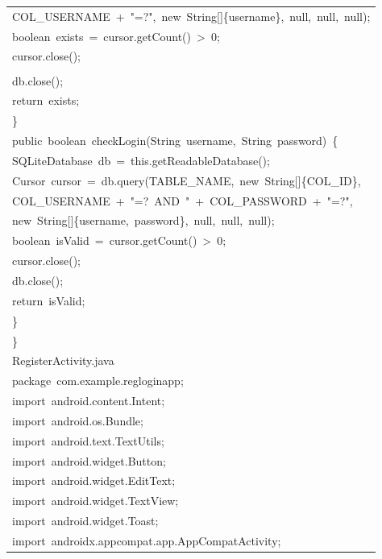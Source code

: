 \documentclass[a4paper,12pt]{article}
\begin{document}
\begin{longtable}{|p{}|}
{\ttfamily\small COL\_USERNAME\ +\ "=?",\ new\ String[]\{username\},\ null,\ null,\ null);} \\
{\ttfamily\small boolean\ exists\ =\ cursor.getCount()\ \textgreater{}\ 0;} \\
{\ttfamily\small cursor.close();} \\
\strut \\
{\ttfamily\small db.close();} \\
{\ttfamily\small return\ exists;} \\
{\ttfamily\small \}} \\
{\ttfamily\small public\ boolean\ checkLogin(String\ username,\ String\ password)\ \{} \\
{\ttfamily\small SQLiteDatabase\ db\ =\ this.getReadableDatabase();} \\
{\ttfamily\small Cursor\ cursor\ =\ db.query(TABLE\_NAME,\ new\ String[]\{COL\_ID\},} \\
{\ttfamily\small COL\_USERNAME\ +\ "=?\ AND\ "\ +\ COL\_PASSWORD\ +\ "=?",} \\
{\ttfamily\small new\ String[]\{username,\ password\},\ null,\ null,\ null);} \\
{\ttfamily\small boolean\ isValid\ =\ cursor.getCount()\ \textgreater{}\ 0;} \\
{\ttfamily\small cursor.close();} \\
{\ttfamily\small db.close();} \\
{\ttfamily\small return\ isValid;} \\
{\ttfamily\small \}} \\
{\ttfamily\small \}} \\
{\ttfamily\small RegisterActivity.java} \\
{\ttfamily\small package\ com.example.regloginapp;} \\
{\ttfamily\small import\ android.content.Intent;} \\
{\ttfamily\small import\ android.os.Bundle;} \\
{\ttfamily\small import\ android.text.TextUtils;} \\
{\ttfamily\small import\ android.widget.Button;} \\
{\ttfamily\small import\ android.widget.EditText;} \\
{\ttfamily\small import\ android.widget.TextView;} \\
{\ttfamily\small import\ android.widget.Toast;} \\
{\ttfamily\small import\ androidx.appcompat.app.AppCompatActivity;} \\

\end{longtable}
\end{document}
